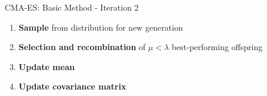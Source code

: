 \documentclass[11pt,compress,t,notes=noshow, xcolor=table]{beamer}
\begin{document}
\begin{vbframe}{CMA-ES: Basic Method - Iteration 2}
\begin{enumerate}
    \item \textbf{Sample} from distribution for new generation

    \framebreak
    
    \item \textbf{Selection and recombination} of $\mu<\lambda$ best-performing offspring
\item \textbf{Update mean}

    \item \textbf{Update covariance matrix} %


\end{enumerate}
\end{vbframe}
\end{document}

